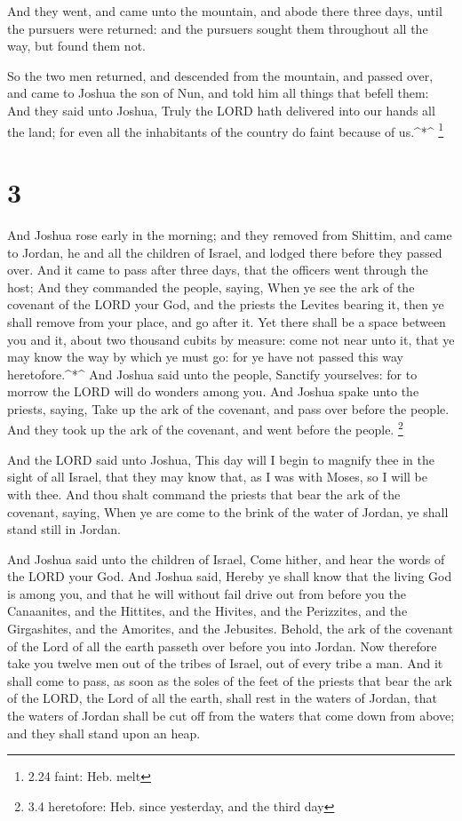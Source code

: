  And they went, and came unto the mountain, and abode there
three days, until the pursuers were returned: and the pursuers sought
them throughout all the way, but found them not.

 So the two men returned, and descended from the mountain,
and passed over, and came to Joshua the son of Nun, and told him all
things that befell them:  And they said unto Joshua, Truly
the LORD hath delivered into our hands all the land; for even all the
inhabitants of the country do faint because of us.\^{}*\^{} \footnote{2.24
  faint: Heb. melt}

\hypertarget{section-2}{%
\section{3}\label{section-2}}

 And Joshua rose early in the morning; and they removed from
Shittim, and came to Jordan, he and all the children of Israel, and
lodged there before they passed over.  And it came to pass
after three days, that the officers went through the host; 
And they commanded the people, saying, When ye see the ark of the
covenant of the LORD your God, and the priests the Levites bearing it,
then ye shall remove from your place, and go after it.  Yet
there shall be a space between you and it, about two thousand cubits by
measure: come not near unto it, that ye may know the way by which ye
must go: for ye have not passed this way heretofore.\^{}*\^{}
 And Joshua said unto the people, Sanctify yourselves: for
to morrow the LORD will do wonders among you.  And Joshua
spake unto the priests, saying, Take up the ark of the covenant, and
pass over before the people. And they took up the ark of the covenant,
and went before the people. \footnote{3.4 heretofore: Heb. since
  yesterday, and the third day}

 And the LORD said unto Joshua, This day will I begin to
magnify thee in the sight of all Israel, that they may know that, as I
was with Moses, so I will be with thee.  And thou shalt
command the priests that bear the ark of the covenant, saying, When ye
are come to the brink of the water of Jordan, ye shall stand still in
Jordan.

 And Joshua said unto the children of Israel, Come hither,
and hear the words of the LORD your God.  And Joshua said,
Hereby ye shall know that the living God is among you, and that he will
without fail drive out from before you the Canaanites, and the Hittites,
and the Hivites, and the Perizzites, and the Girgashites, and the
Amorites, and the Jebusites.  Behold, the ark of the
covenant of the Lord of all the earth passeth over before you into
Jordan.  Now therefore take you twelve men out of the
tribes of Israel, out of every tribe a man.  And it shall
come to pass, as soon as the soles of the feet of the priests that bear
the ark of the LORD, the Lord of all the earth, shall rest in the waters
of Jordan, that the waters of Jordan shall be cut off from the waters
that come down from above; and they shall stand upon an heap.

